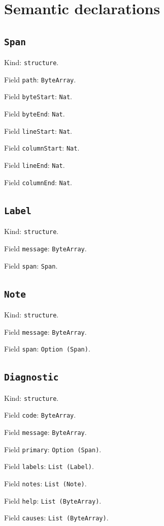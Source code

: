 \documentclass[11pt]{article}
\begin{document}
\section*{Semantic declarations}
\subsection*{\texttt{Span}}
\noindent Kind: \texttt{structure}.\par
\noindent Field \texttt{path}: \texttt{ByteArray}.\par
\noindent Field \texttt{byteStart}: \texttt{Nat}.\par
\noindent Field \texttt{byteEnd}: \texttt{Nat}.\par
\noindent Field \texttt{lineStart}: \texttt{Nat}.\par
\noindent Field \texttt{columnStart}: \texttt{Nat}.\par
\noindent Field \texttt{lineEnd}: \texttt{Nat}.\par
\noindent Field \texttt{columnEnd}: \texttt{Nat}.\par
\subsection*{\texttt{Label}}
\noindent Kind: \texttt{structure}.\par
\noindent Field \texttt{message}: \texttt{ByteArray}.\par
\noindent Field \texttt{span}: \texttt{Span}.\par
\subsection*{\texttt{Note}}
\noindent Kind: \texttt{structure}.\par
\noindent Field \texttt{message}: \texttt{ByteArray}.\par
\noindent Field \texttt{span}: \texttt{Option (Span)}.\par
\subsection*{\texttt{Diagnostic}}
\noindent Kind: \texttt{structure}.\par
\noindent Field \texttt{code}: \texttt{ByteArray}.\par
\noindent Field \texttt{message}: \texttt{ByteArray}.\par
\noindent Field \texttt{primary}: \texttt{Option (Span)}.\par
\noindent Field \texttt{labels}: \texttt{List (Label)}.\par
\noindent Field \texttt{notes}: \texttt{List (Note)}.\par
\noindent Field \texttt{help}: \texttt{List (ByteArray)}.\par
\noindent Field \texttt{causes}: \texttt{List (ByteArray)}.\par
\end{document}
